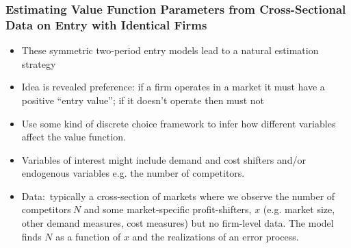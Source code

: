 \documentclass[notes=show]{beamer}
\begin{document}
\begin{frame}%

\frametitle{Estimating Value
Function Parameters from Cross-Sectional Data on
 Entry with Identical Firms}

\begin{itemize}
\item These symmetric two-period entry models lead to a natural estimation
strategy

\item Idea is revealed preference: if a firm operates in a market it must
have a positive \textquotedblleft entry value\textquotedblright ; if it
doesn't operate then must not

\item Use some kind of discrete choice framework to infer how different
variables affect the value function.

\item Variables of interest might include demand and cost shifters and/or
endogenous variables e.g. the number of competitors.

\item Data:\ typically a cross-section of markets where we observe the
number of competitors$\ N$ and some market-specific profit-shifters, $x$
(e.g. market size, other demand measures, cost measures) but no firm-level
data. The model finds $N$ as a function of $x$ and the realizations of an
error process.
\end{itemize}

\end{frame}%
\end{document}
